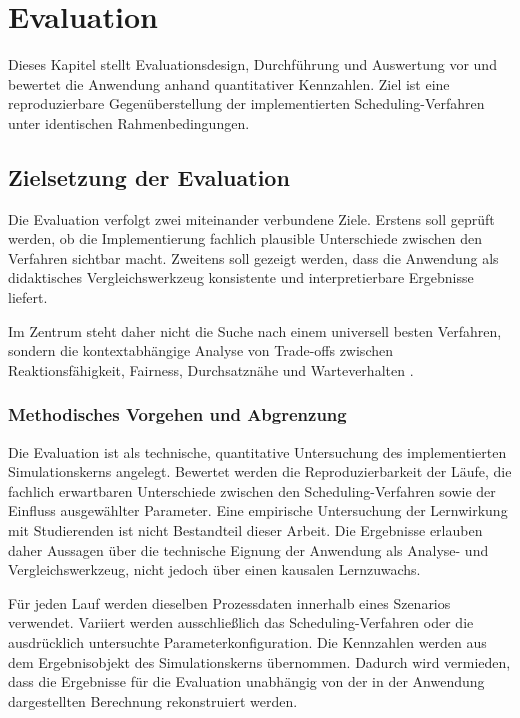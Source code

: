 \chapter{Evaluation}

Dieses Kapitel stellt Evaluationsdesign, Durchführung und Auswertung vor und bewertet die Anwendung anhand quantitativer Kennzahlen. Ziel ist eine reproduzierbare Gegenüberstellung der implementierten Scheduling-Verfahren unter identischen Rahmenbedingungen.

\section{Zielsetzung der Evaluation}

Die Evaluation verfolgt zwei miteinander verbundene Ziele. Erstens soll geprüft werden, ob die Implementierung fachlich plausible Unterschiede zwischen den Verfahren sichtbar macht. Zweitens soll gezeigt werden, dass die Anwendung als didaktisches Vergleichswerkzeug konsistente und interpretierbare Ergebnisse liefert.

Im Zentrum steht daher nicht die Suche nach einem universell besten Verfahren, sondern die kontextabhängige Analyse von Trade-offs zwischen Reaktionsfähigkeit, Fairness, Durchsatznähe und Warteverhalten \cite{silberschatz2018operating,tanenbaum2014modern,pinedo2016scheduling}.

\subsection{Methodisches Vorgehen und Abgrenzung}

Die Evaluation ist als technische, quantitative Untersuchung des implementierten Simulationskerns angelegt. Bewertet werden die Reproduzierbarkeit der Läufe, die fachlich erwartbaren Unterschiede zwischen den Scheduling-Verfahren sowie der Einfluss ausgewählter Parameter. Eine empirische Untersuchung der Lernwirkung mit Studierenden ist nicht Bestandteil dieser Arbeit. Die Ergebnisse erlauben daher Aussagen über die technische Eignung der Anwendung als Analyse- und Vergleichswerkzeug, nicht jedoch über einen kausalen Lernzuwachs.

Für jeden Lauf werden dieselben Prozessdaten innerhalb eines Szenarios verwendet. Variiert werden ausschließlich das Scheduling-Verfahren oder die ausdrücklich untersuchte Parameterkonfiguration. Die Kennzahlen werden aus dem Ergebnisobjekt des Simulationskerns übernommen. Dadurch wird vermieden, dass die Ergebnisse für die Evaluation unabhängig von der in der Anwendung dargestellten Berechnung rekonstruiert werden.

